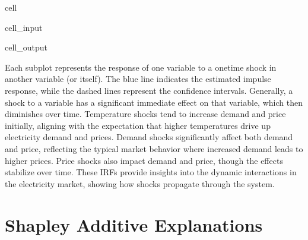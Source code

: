 \documentclass[letterpaper,10pt,english]{jupyterBook}
\begin{document}
\begin{sphinxuseclass}{cell}\begin{sphinxVerbatimInput}

\begin{sphinxuseclass}{cell_input}
\begin{sphinxVerbatim}[commandchars=\\\{\}]
    

\end{sphinxVerbatim}

\end{sphinxuseclass}\end{sphinxVerbatimInput}
\begin{sphinxVerbatimOutput}

\begin{sphinxuseclass}{cell_output}
\noindent{}

\end{sphinxuseclass}\end{sphinxVerbatimOutput}

\end{sphinxuseclass}
\sphinxAtStartPar
Each subplot represents the response of one variable to a one\sphinxhyphen{}time shock in another variable (or itself). The blue line indicates the estimated impulse response, while the dashed lines represent the confidence intervals. Generally, a shock to a variable has a significant immediate effect on that variable, which then diminishes over time. Temperature shocks tend to increase demand and price initially, aligning with the expectation that higher temperatures drive up electricity demand and prices. Demand shocks significantly affect both demand and price, reflecting the typical market behavior where increased demand leads to higher prices. Price shocks also impact demand and price, though the effects stabilize over time. These IRFs provide insights into the dynamic interactions in the electricity market, showing how shocks propagate through the system.

\sphinxstepscope


\chapter{Shapley Additive Explanations}
\label{\detokenize{notebooks/shapley:shapley-additive-explanations}}\label{\detokenize{notebooks/shapley::doc}}
\end{document}

